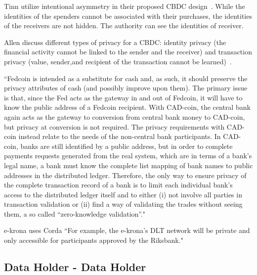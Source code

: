 \documentclass[runningheads]{llncs}
\begin{document}
Tinn \etal utilize intentional asymmetry in their proposed CBDC design~\cite{TB21}. While the identities of the spenders cannot be associated with their purchases, the identities of the receivers are not hidden. The authority can see the identities of receiver.

Allen \etal discuss different types of privacy for a CBDC: identity privacy (the financial activity cannot be linked to the sender and the receiver) and transaction privacy (value, sender,and recipient of the transaction cannot be learned)~\cite{ACEF20}.

``Fedcoin is intended as a substitute for cash and, as such, it should
preserve the privacy attributes of cash (and possibly improve upon them). The primary issue is that, since the Fed acts as the gateway in and out of Fedcoin,
it will have to know the public address of a Fedcoin recipient. With CAD-coin, the central bank again acts as the gateway to conversion from central bank
money to CAD-coin, but privacy at conversion is not required.  The privacy requirements with CAD-coin instead relate to the needs of the non-central bank participants.  In CAD-coin, banks are still identified by a public address, but in order to complete
payments requests generated from the real system, which are in terms of a bank’s legal name, a bank must know the complete list mapping of bank names to public addresses in the distributed ledger. Therefore, the only way to ensure privacy of the complete transaction record of a bank is to limit each individual bank’s access to the distributed ledger itself and to either (i) not involve all parties in transaction validation or (ii) find a way of validating the trades without seeing them, a so called “zero-knowledge validation”."~\cite{GR16}

e-krona uses Corda ``For example, the e-krona’s DLT network will be private and only accessible for participants
approved by the Riksbank."~\cite{KRONA}

\subsection{Data Holder - Data Holder}


\end{document}
